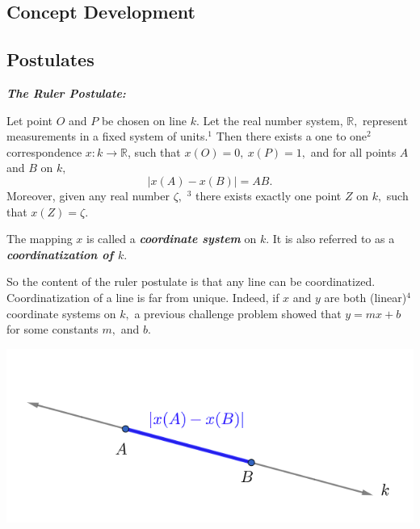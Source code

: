 \documentclass{tufte-handout}
\newcommand{\uv}{\vspace{.1in}}
\begin{document}
\begin{tcolorbox}[enhanced jigsaw,breakable,pad at break*=1mm,
  colback=cyan!2!white,colframe=blue!75!black,title=Student View: Slide 8,drop fuzzy shadow,watermark color=white,watermark text=\arabic{tcbbreakpart}]\section{Concept Development}\subsection{Postulates}
  
  \begin{tcolorbox}[colback=blue!4]
  \textbf{\textit{The Ruler Postulate:}}
  
  Let point $O$ and $P$ be chosen on line $k.$ Let the real number system, $\mathbb{R,}$ represent measurements in a fixed system of units.$^1$ Then there exists a one to one$^2$ correspondence $x: k \rightarrow \mathbb{R}$, such that $x(O)= 0, \ x(P) = 1,$ and for all points $A$ and $B$ on $k,$ 
  \[|x(A)-x(B)|=AB.
  \]
  Moreover, given any real number $\zeta,$ $^3$ there exists exactly one point $Z$ on $k,$ such that $x(Z)=\zeta.$
  \end{tcolorbox}
  The mapping $x$ is called a \textbf{\textit{coordinate system}} on $k.$ It is also referred to as a \textbf{\textit{coordinatization of $k.$}} 
  
  \uv So the content of the ruler postulate is that any line can be coordinatized. Coordinatization of a line is far from unique. Indeed, if $x$ and $y$ are both (linear)$^4$ coordinate systems on $k,$ a previous challenge problem showed that $\displaystyle{y=mx + b}$ for some constants $m,$ and $b.$ 
  \begin{center}
 \includegraphics[]{distance.png}
 \end{center}
\end{tcolorbox}
\pagebreak
\end{document}
